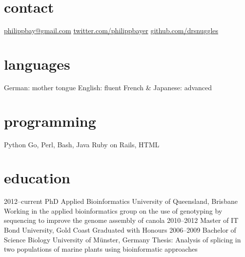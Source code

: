 \documentclass[]{friggeri-cv} %
\begin{document}


\begin{aside} %
\section{contact}
\href{mailto:philippbay@gmail.com}{philippbay@gmail.com}
\href{http://twitter.com/philippbayer}{twitter.com/philippbayer}
\href{http://github.com/drsnuggles}{github.com/drsnuggles}
\section{languages}
German: mother tongue
English: fluent
French \& Japanese: advanced
\section{programming}
Python
Go, Perl, Bash, Java
Ruby on Rails, HTML
\end{aside}


\section{education}

\begin{entrylist}
\entry
{2012--current}
{PhD {\normalfont Applied Bioinformatics}}
{University of Queensland, Brisbane}
{Working in the applied bioinformatics group on the use of genotyping by sequencing to improve the genome assembly of canola}
\entry
{2010--2012}
{Master {\normalfont of IT}}
{Bond University, Gold Coast}
{Graduated with Honours}
\entry
{2006--2009}
{Bachelor of Science {\normalfont Biology}}
{University of Münster, Germany}
{Thesis: Analysis of splicing in two populations of marine plants
using bioinformatic approaches}
\end{entrylist}
\end{document}
